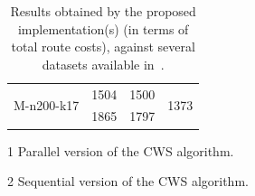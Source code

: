 \begin{table}[h!]
\begin{threeparttable}
\begin{tabularx}{0.40\textwidth}{ X X X X }
            \midrule
            \multirow{2}{*}{M-n200-k17} & 1504  & 1500  & \multirow{2}{*}{1373} \\ [0.5ex]
                                        & 1865  & 1797  &                       \\ [0.5ex]
            \bottomrule
        \end{tabularx}
        \begin{tablenotes}
            \footnotesize
            \item[1]Parallel version of the CWS algorithm.
            \item[2]Sequential version of the CWS algorithm.
        \end{tablenotes}
    \caption{Results obtained by the proposed implementation(s) (in terms of 
            total route costs), against several datasets available 
            in~\cite{website:cvrp-datasets}.}
    \label{tab:results-1}
    \end{threeparttable}
\end{table}

